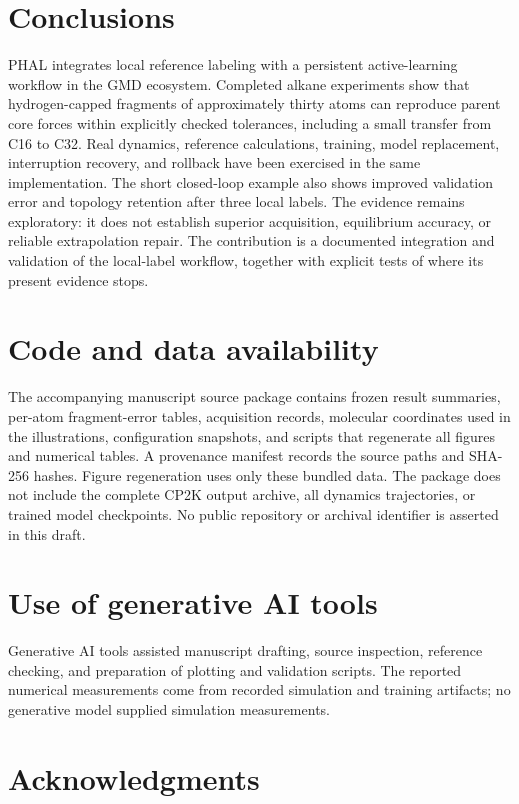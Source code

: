 \documentclass[11pt,a4paper]{article}
\begin{document}
\section{Conclusions}
PHAL integrates local reference labeling with a persistent active-learning
workflow in the GMD ecosystem. Completed alkane experiments show that
hydrogen-capped fragments of approximately thirty atoms can reproduce parent
core forces within explicitly checked tolerances, including a small
transfer from C16 to C32. Real dynamics, reference calculations, training,
model replacement, interruption recovery, and rollback have been exercised
in the same implementation. The short closed-loop example also shows
improved validation error and topology retention after three local labels.
The evidence remains exploratory: it does not establish superior acquisition,
equilibrium accuracy, or reliable extrapolation repair.
The contribution is a documented integration and validation of the local-label
workflow, together with explicit tests of where its present evidence stops.

\section*{Code and data availability}
The accompanying manuscript source package contains frozen result summaries,
per-atom fragment-error tables, acquisition records, molecular coordinates
used in the illustrations, configuration snapshots, and scripts that regenerate
all figures and numerical tables. A provenance manifest records the source
paths and SHA-256 hashes. Figure regeneration uses only these bundled data.
The package does not include the complete CP2K output archive, all dynamics
trajectories, or trained model checkpoints. No public repository or archival
identifier is asserted in this draft.

\section*{Use of generative AI tools}
Generative AI tools assisted manuscript drafting, source inspection,
reference checking, and preparation of plotting and validation scripts.
The reported numerical measurements come from recorded simulation and
training artifacts; no generative model supplied simulation measurements.

\section*{Acknowledgments}
\PaperAcknowledgments
\end{document}
